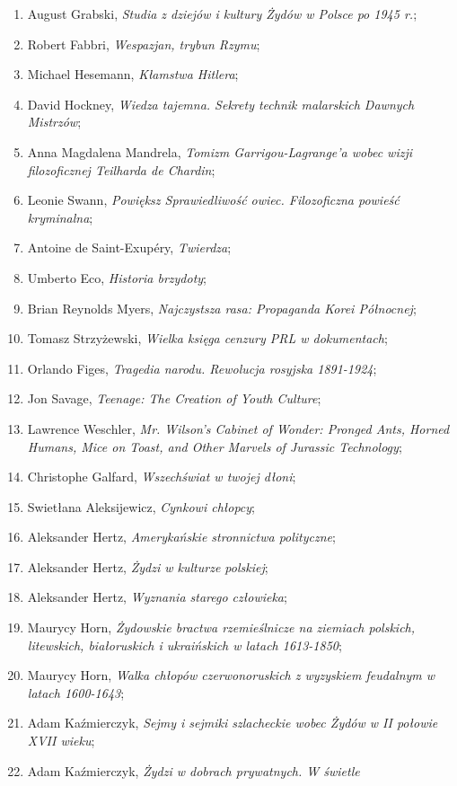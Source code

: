 \documentclass[a4paper,11pt]{article}
\begin{document}
\begin{enumerate}
\item August Grabski, \emph{Studia z dziejów i kultury Żydów w Polsce
    po 1945 r.};
\item Robert Fabbri, \emph{Wespazjan, trybun Rzymu};
\item Michael Hesemann, \emph{Kłamstwa Hitlera};
\item David Hockney, \emph{Wiedza tajemna. Sekrety technik malarskich
    Dawnych Mistrzów};
\item Anna Magdalena Mandrela, \emph{Tomizm Garrigou-Lagrange’a wobec
    wizji filozoficznej Teilharda de Chardin};
\item Leonie Swann, \emph{Powiększ Sprawiedliwość owiec. Filozoficzna
    powieść kryminalna};
\item Antoine de Saint-Exupéry, \emph{Twierdza};
\item Umberto Eco, \emph{Historia brzydoty};
\item Brian Reynolds Myers, \emph{Najczystsza rasa: Propaganda Korei
    Północnej};
\item Tomasz Strzyżewski, \emph{Wielka księga cenzury PRL w
    dokumentach};
\item Orlando Figes, \emph{Tragedia narodu. Rewolucja rosyjska
    1891-1924};
\item Jon Savage, \emph{Teenage: The Creation of Youth Culture};
\item Lawrence Weschler, \emph{Mr. Wilson's Cabinet of Wonder: Pronged
    Ants, Horned Humans, Mice on Toast, and Other Marvels of Jurassic
    Technology};
\item Christophe Galfard, \emph{Wszechświat w twojej dłoni};
\item Swietłana Aleksijewicz, \emph{Cynkowi chłopcy};
\item Aleksander Hertz, \emph{Amerykańskie stronnictwa polityczne};
\item Aleksander Hertz, \emph{Żydzi w kulturze polskiej};
\item Aleksander Hertz, \emph{Wyznania starego człowieka};
\item Maurycy Horn, \emph{Żydowskie bractwa rzemieślnicze na ziemiach
    polskich, litewskich, białoruskich i ukraińskich w latach
    1613-1850};
\item Maurycy Horn, \emph{Walka chłopów czerwonoruskich z wyzyskiem
    feudalnym w latach 1600-1643};
\item Adam Kaźmierczyk, \emph{Sejmy i sejmiki szlacheckie wobec Żydów
    w II połowie XVII wieku};
\item Adam Kaźmierczyk, \emph{Żydzi w dobrach prywatnych. W świetle
}
\end{enumerate}
\end{document}
